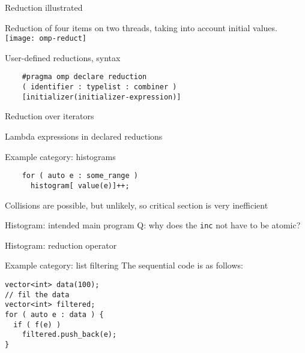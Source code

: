 \documentclass[11pt,headernav]{beamer}
\begin{document}
\begin{numberedframe}{Reduction illustrated}
  \label{fig:omp-reduct}

  Reduction of four items on two threads, taking into account
  initial values.
  \texttt{[image: omp-reduct]}
\end{numberedframe}

\begin{numberedframe}{User-defined reductions, syntax}
  \begin{lstlisting}
    #pragma omp declare reduction 
    ( identifier : typelist : combiner )
    [initializer(initializer-expression)]
  \end{lstlisting}
\end{numberedframe}

\begin{numberedframe}{Reduction over iterators}
  
\end{numberedframe}

\begin{numberedframe}{Lambda expressions in declared reductions}
  
\end{numberedframe}


\begin{numberedframe}{Example category: histograms}
  \begin{lstlisting}
    for ( auto e : some_range )
      histogram[ value(e)]++;
  \end{lstlisting}
  Collisions are possible, but unlikely, so critical section is very inefficient
\end{numberedframe}

\begin{numberedframe}{Histogram: intended main program}
  Q: why does the \lstinline{inc} not have to be atomic?
\end{numberedframe}

\begin{numberedframe}{Histogram: reduction operator}
\end{numberedframe}

\begin{numberedframe}{Example category: list filtering}
The sequential code is as follows:
\begin{lstlisting}
vector<int> data(100);
// fil the data
vector<int> filtered;
for ( auto e : data ) {
  if ( f(e) )
    filtered.push_back(e);
}
\end{lstlisting}
\end{numberedframe}
\end{document}

